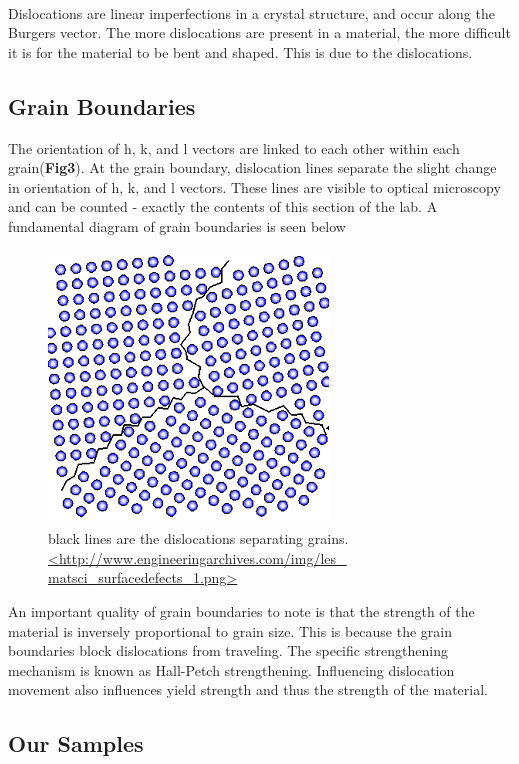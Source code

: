 \documentclass{article}
\begin{document}
\ 

Dislocations are linear imperfections in a crystal structure, and occur along the Burgers vector. The more dislocations are present in a material, the more difficult it is for the material to be bent and shaped. This is due to the dislocations.

\subsection{Grain Boundaries} 

The orientation of h, k, and l vectors are linked to each other within each grain(\textbf{Fig3}). At the grain boundary, dislocation lines separate the slight change in orientation of h, k, and l vectors. These lines are visible to optical microscopy and can be counted - exactly the contents of this section of the lab. A fundamental diagram of grain boundaries is seen below

\begin{figure}[h]
	\centering
	\includegraphics[scale=1.5]{grain.png}
	\caption{black lines are the dislocations separating grains. \url{<http://www.engineeringarchives.com/img/les\_ matsci_surfacedefects_1.png>}}
\end{figure}

An important quality of grain boundaries to note is that the strength of the material is inversely proportional to grain size. 
This is because the grain boundaries block dislocations from traveling. The specific strengthening mechanism is known as Hall-Petch strengthening. Influencing dislocation movement also influences yield strength and thus the strength of the material.

\subsection{Our Samples}
\end{document}
